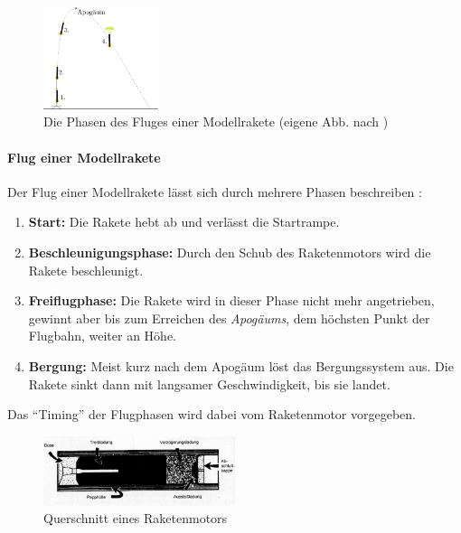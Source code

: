 \documentclass[10pt,a4paper]{article}
\begin{document}
\begin{figure}
	\centering
	\includegraphics[width=0.3\textwidth]{Bilder/Flug-einer-Modellrakete.png}
	\caption{Die Phasen des Fluges einer Modellrakete (eigene Abb. nach \cite{sn})}
	\label{fig-Flug-einer-Modellrakete}
	\vspace{-45pt}
\end{figure}

\paragraph{Flug einer Modellrakete}
\label{sssec-Flug-einer-Modellrakete}
Der Flug einer Modellrakete lässt sich durch mehrere Phasen beschreiben \cite{om,sn}:
\begin{enumerate}
	\item \textbf{Start:} Die Rakete hebt ab und verlässt die Startrampe.
	\item \textbf{Beschleunigungsphase:} Durch den Schub des Raketenmotors wird die Rakete beschleunigt.
	\item \textbf{Freiflugphase:} Die Rakete wird in dieser Phase nicht mehr angetrieben, gewinnt aber bis zum Erreichen des \textit{Apogäums}, dem höchsten Punkt der Flugbahn, weiter an Höhe.
	\item \textbf{Bergung:} Meist kurz nach dem Apogäum löst das Bergungssystem aus. Die Rakete sinkt dann mit langsamer Geschwindigkeit, bis sie landet.
\end{enumerate}

\noindent
Das "`Timing"' der Flugphasen wird dabei vom Raketenmotor vorgegeben.
 
\begin{figure}[h]
	\centering
	\includegraphics[width=0.5\textwidth]{Bilder/Raketenmotor-Schema.png}
	\caption{Querschnitt eines Raketenmotors \cite{om}}
\end{figure}
\end{document}
